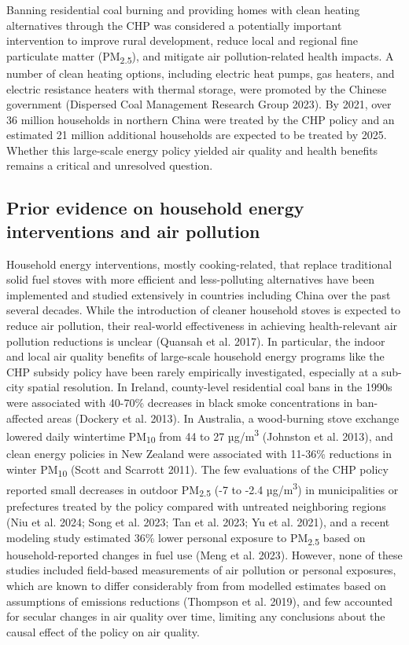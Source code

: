 \documentclass[
  letterpaper,
  DIV=11,
  numbers=noendperiod]{scrartcl}
\begin{document}
Banning residential coal burning and providing homes with clean heating
alternatives through the CHP was considered a potentially important
intervention to improve rural development, reduce local and regional
fine particulate matter (PM\textsubscript{2.5}), and mitigate air
pollution-related health impacts. A number of clean heating options,
including electric heat pumps, gas heaters, and electric resistance
heaters with thermal storage, were promoted by the Chinese government
(Dispersed Coal Management Research Group 2023). By 2021, over 36
million households in northern China were treated by the CHP policy and
an estimated 21 million additional households are expected to be treated
by 2025. Whether this large-scale energy policy yielded air quality and
health benefits remains a critical and unresolved question.

\subsection{Prior evidence on household energy interventions and air
pollution}\label{prior-evidence-on-household-energy-interventions-and-air-pollution}

Household energy interventions, mostly cooking-related, that replace
traditional solid fuel stoves with more efficient and less-polluting
alternatives have been implemented and studied extensively in countries
including China over the past several decades. While the introduction of
cleaner household stoves is expected to reduce air pollution, their
real-world effectiveness in achieving health-relevant air pollution
reductions is unclear (Quansah et al. 2017). In particular, the indoor
and local air quality benefits of large-scale household energy programs
like the CHP subsidy policy have been rarely empirically investigated,
especially at a sub-city spatial resolution. In Ireland, county-level
residential coal bans in the 1990s were associated with 40-70\%
decreases in black smoke concentrations in ban-affected areas (Dockery
et al. 2013). In Australia, a wood-burning stove exchange lowered daily
wintertime PM\textsubscript{10} from 44 to 27 µg/m\textsuperscript{3}
(Johnston et al. 2013), and clean energy policies in New Zealand were
associated with 11-36\% reductions in winter PM\textsubscript{10} (Scott
and Scarrott 2011). The few evaluations of the CHP policy reported small
decreases in outdoor PM\textsubscript{2.5} (-7 to -2.4
µg/m\textsuperscript{3}) in municipalities or prefectures treated by the
policy compared with untreated neighboring regions (Niu et al. 2024;
Song et al. 2023; Tan et al. 2023; Yu et al. 2021), and a recent
modeling study estimated 36\% lower personal exposure to
PM\textsubscript{2.5} based on household-reported changes in fuel use
(Meng et al. 2023). However, none of these studies included field-based
measurements of air pollution or personal exposures, which are known to
differ considerably from from modelled estimates based on assumptions of
emissions reductions (Thompson et al. 2019), and few accounted for
secular changes in air quality over time, limiting any conclusions about
the causal effect of the policy on air quality.
\end{document}
